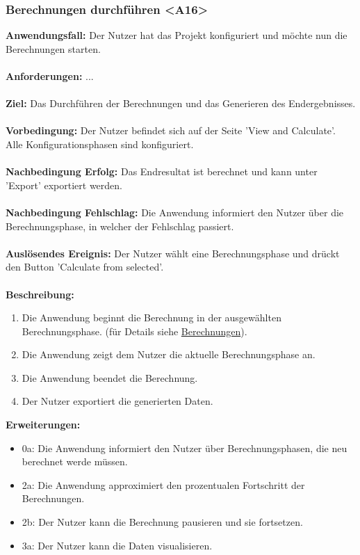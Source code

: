 \documentclass[parskip=full]{scrartcl} %
\begin{document}
\subsubsection*{Berechnungen durchführen <A16>}
\textbf{Anwendungsfall:} Der Nutzer hat das Projekt konfiguriert und möchte nun die Berechnungen starten.\\\\
\textbf{Anforderungen:} ...\\\\
\textbf{Ziel:} Das Durchführen der Berechnungen und das Generieren des Endergebnisses.\\\\
\textbf{Vorbedingung:} Der Nutzer befindet sich auf der Seite 'View and Calculate'. Alle Konfigurationsphasen sind konfiguriert.\\\\
\textbf{Nachbedingung Erfolg:} Das Endresultat ist berechnet und kann unter 'Export' exportiert werden. \\\\
\textbf{Nachbedingung Fehlschlag:} Die Anwendung informiert den Nutzer über die Berechnungsphase, in welcher der Fehlschlag passiert. \\\\
\textbf{Auslösendes Ereignis:} Der Nutzer wählt eine Berechnungsphase und drückt den Button 'Calculate from selected'.\\\\
\textbf{Beschreibung:}
\begin{enumerate}
    \item Die Anwendung beginnt die Berechnung in der ausgewählten Berechnungsphase. (für Details siehe \hyperlink{calculations}{Berechnungen}).
    \item Die Anwendung zeigt dem Nutzer die aktuelle Berechnungsphase an.
    \item Die Anwendung beendet die Berechnung.
    \item Der Nutzer exportiert die generierten Daten.
\end{enumerate}
\textbf{Erweiterungen:} 
\begin{itemize}
    \item 0a: Die Anwendung informiert den Nutzer über Berechnungsphasen, die neu berechnet werde müssen.
    \item 2a: Die Anwendung approximiert den prozentualen Fortschritt der Berechnungen.
    \item 2b: Der Nutzer kann die Berechnung pausieren und sie fortsetzen.
    \item 3a: Der Nutzer kann die Daten visualisieren.
\end{itemize}
\newpage
\end{document}
